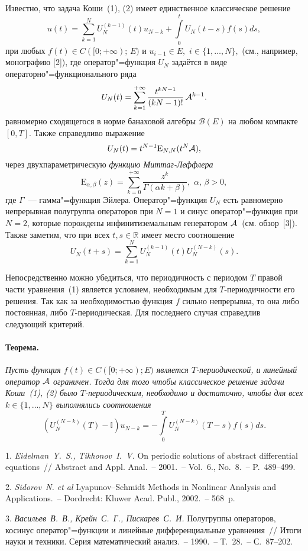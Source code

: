 Известно, что задача Коши~(1), (2) имеет единственное классическое решение
$$
u(t)=\sum\limits_{k=1}^{N}U_{N}^{(k-1)}(t)u_{N-k}+\int\limits_{0}^{t}U_{N}(t-s)f(s)ds,
$$
при любых $f(t)\in C([0;+\infty);\,E)$ и $u_{i-1}\in E,\,\,i\in\lbrace 1,\ldots,N\rbrace,$ (см., например, монографию [2]), где оператор"=функция $U_{N}$ задаётся в виде операторно"=функционального ряда
$$
U_{N}(t)=\sum\limits_{k=1}^{+\infty}\frac{t^{kN-1}}{(kN-1)!}\,{\cal A}^{k-1}.
$$
равномерно сходящегося в норме банаховой алгебры ${\mathscr B}(E)$ на любом компакте $[0,T]$. Также справедливо выражение
$$
U_{N}(t)=t^{N-1}{\mathrm E}_{N,N}(t^{N}{\cal A}),
$$
через двухпараметрическую {\it функцию Миттаг-Леффлера}
$$
{\mathrm E}_{\alpha,\beta}(z)=\sum\limits_{k=0}^{+\infty}\frac{z^{k}}{\Gamma(\alpha k+\beta)},\,\,\alpha,\,\beta>0,
$$
где $\Gamma$~--- гамма"=функция Эйлера. Оператор"=функция $U_{N}$ есть равномерно непрерывная полугруппа операторов при $N=1$ и синус оператор"=функция при $N=2$, которые порождены инфинитиземальным генератором ${\cal A}$~(см. обзор~[3]). Также заметим, что при всех $t,s\in{\mathbb R}$ имеет место  соотношение
$$
U_{N}(t+s)=\sum\limits_{k=1}^{N}U_{N}^{(k-1)}(t)U_{N}^{(N-k)}(s).
$$

Непосредственно можно убедиться, что периодичность с периодом $T$ правой части  уравнения~(1) является условием, необходимым для $T$-периодичности его решения. Так как за необходимостью функция $f$ сильно непрерывна, то она либо постоянная, либо $T$-периодическая. Для последнего случая справедлив следующий критерий.

\paragraph{Теорема.} {\it Пусть функция $f(t)\in C([0;+\infty);E)$ является $T$-периодической, и линейный оператор ${\cal A}$ ограничен. Тогда для того чтобы классическое решение задачи Коши~(1), (2) было $T$-периодическим,  необходимо и достаточно, чтобы для всех $k\in\lbrace 1,\ldots,N\rbrace$ выполнялись соотношения
$$
(U_{N}^{(N-k)}(T)-{\mathbb I})u_{N-k}=-\int\limits_{0}^{T}U_{N}^{(N-k)}(T-s)f(s)ds.
$$}

\litlist

1. {\it Eidelman~Y.~S., Tikhonov~I.~V.} On periodic solutions of abstract differential equations~// Abstract and Appl. Anal.~– 2001.~– Vol.~6., No.~8.~– P.~489–499.

2. {\it Sidorov~N. et al} Lyapunov–Schmidt Methods in Nonlinear Analysis and Applications.~– Dordrecht: Kluwer Acad. Publ., 2002.~– 568~p.

3. {\it Васильев~В.~В., Крейн~С.~Г., Пискарев~С.~И.} Полугруппы операторов, косинус оператор"=функции и линейные дифференциальные уравнения~// Итоги науки и техники. Серия математический анализ.~– 1990.~– Т.~28.~– С.~87–202.
